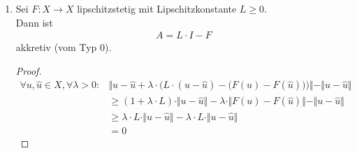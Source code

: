 \begin{beispiel}
\begin{enumerate}[label=(\alph*)]
\begin{proof}
\begin{align*}
&=\int\limits_\Omega\Big|f\big(u(x)\big)-f\big(\hat{u}(x)\big)\Big|^2\d x\\
&\leq
\int\limits_\Omega L^2\cdot\big|u(x)-\hat{u}(x)\big|^2\d x\\
&=L^2\cdot\Vert u-\hat{u}\Vert^2_{L^2}
\end{align*}
Zur Wohldefiniertheit: Für alle $u\in L^2(\Omega)$ gilt:
\begin{align*}
\left(\int\limits_\Omega\Big|f\big(u(x)\big)\Big|^2\d x\right)^{\frac{1}{2}}
&=\left(\int\limits_\Omega\Big|f\big(u(x)\big)-f(0)+f(0)\Big|^2\d x\right)^{\frac{1}{2}}\\
&\leq
\sqrt{\int\limits_\Omega\Big|f\big(u(x)\big)-f(0)\Big|^2\d x}+|f(0)|\cdot\underbrace{|\Omega|}_{\text{Maß von }\Omega}\\
&\leq
L\cdot\Vert u\Vert_{L^2}+|f(0)|\cdot|\Omega|<\infty
\end{align*}
\end{proof}
\item Sei $F:X\to X$ lipschitzstetig mit Lipschitzkonstante $L\geq0$.\\
Dann ist 
\begin{align*}
A=L\cdot I-F
\end{align*}
akkretiv (vom Typ $0$).
\begin{proof}
\begin{align*}
\forall u,\hat{u}\in X,\forall \lambda>0:
&\bigg\Vert u-\hat{u}+\lambda\cdot\Big(L\cdot(u-\hat{u})-\big(F(u)-F(\hat{u})\big)\Big)\bigg\Vert-\Vert u-\hat{u}\Vert\\
&\geq
(1+\lambda\cdot L)\cdot\Vert u-\hat{u}\Vert-\lambda\cdot\Vert F(u)-F(\hat{u})\Vert-\Vert u-\hat{u}\Vert\\
&\geq
\lambda\cdot L\cdot\Vert u-\hat{u}\Vert-\lambda\cdot L\cdot\Vert u-\hat{u}\Vert\\
&=0
\end{align*}
\end{proof}
\end{enumerate}
\end{beispiel}

